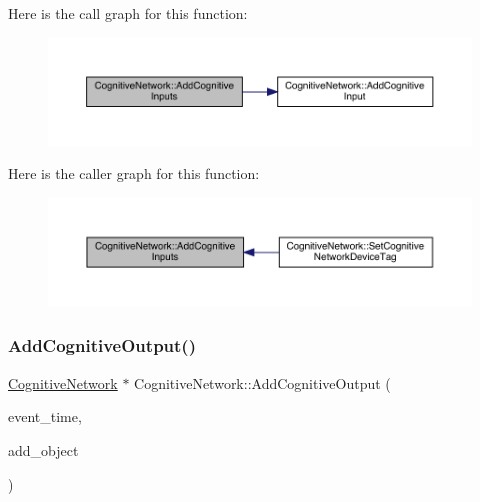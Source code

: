 Here is the call graph for this function\+:
\nopagebreak
\begin{figure}[H]
\begin{center}
\leavevmode
\includegraphics[width=350pt]{class_cognitive_network_afc92c9b378e7e0873d0164bc4f2635df_cgraph}
\end{center}
\end{figure}
Here is the caller graph for this function\+:
\nopagebreak
\begin{figure}[H]
\begin{center}
\leavevmode
\includegraphics[width=350pt]{class_cognitive_network_afc92c9b378e7e0873d0164bc4f2635df_icgraph}
\end{center}
\end{figure}
\mbox{\label{class_cognitive_network_a8a9b533b89b7d62b21cf41bdf957ef14}} 
\subsubsection{\texorpdfstring{Add\+Cognitive\+Output()}{AddCognitiveOutput()}}
{\footnotesize\ttfamily \hyperlink{class_cognitive_network}{Cognitive\+Network} $\ast$ Cognitive\+Network\+::\+Add\+Cognitive\+Output (\begin{DoxyParamCaption}\item[{std\+::chrono\+::time\+\_\+point$<$ \hyperlink{universe_8h_a0ef8d951d1ca5ab3cfaf7ab4c7a6fd80}{Clock} $>$}]{event\+\_\+time,  }\item[{\hyperlink{class_cognitive_network}{Cognitive\+Network} $\ast$}]{add\+\_\+object }\end{DoxyParamCaption})}



